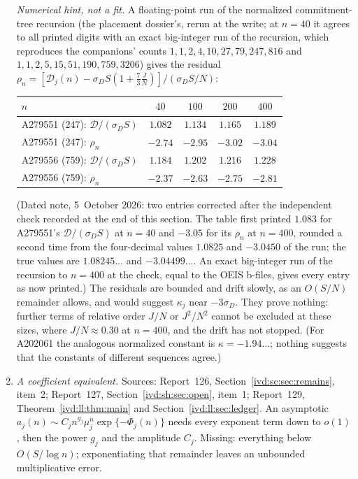 \documentclass[11pt,letterpaper]{article}
\theoremstyle{remark}\newtheorem{remark}[theorem]{Remark}
\numberwithin{equation}{section}
\newcommand{\Dfc}{\mathcal D}
\begin{document}
\begin{enumerate}
\emph{Numerical hint, not a fit.} A floating-point run of the normalized commitment-tree recursion (the placement dossier's, rerun at the write; at $n=40$ it agrees to all printed digits with an exact big-integer run of the recursion, which reproduces the companions' counts $1,1,2,4,10,27,79,247,816$ and $1,1,2,5,15,51,190,759,3206$) gives the residual $\rho_n=[\Dfc_j(n)-\sigma_DS(1+\frac73\frac JN)]/(\sigma_DS/N)$:
\begin{center}
\small
\begin{tabular}{@{}lcccc@{}}
\toprule
$n$ & $40$ & $100$ & $200$ & $400$\\
\midrule
A279551 (247): $\Dfc/(\sigma_DS)$ & $1.082$ & $1.134$ & $1.165$ & $1.189$\\
A279551 (247): $\rho_n$ & $-2.74$ & $-2.95$ & $-3.02$ & $-3.04$\\
A279556 (759): $\Dfc/(\sigma_DS)$ & $1.184$ & $1.202$ & $1.216$ & $1.228$\\
A279556 (759): $\rho_n$ & $-2.37$ & $-2.63$ & $-2.75$ & $-2.81$\\
\bottomrule
\end{tabular}
\end{center}
(Dated note, 5~October 2026: two entries corrected after the independent check recorded at the end of this section. The table first printed $1.083$ for A279551's $\Dfc/(\sigma_DS)$ at $n=40$ and $-3.05$ for its $\rho_n$ at $n=400$, rounded a second time from the four-decimal values $1.0825$ and $-3.0450$ of the run; the true values are $1.08245\ldots$ and $-3.04499\ldots$. An exact big-integer run of the recursion to $n=400$ at the check, equal to the OEIS b-files, gives every entry as now printed.)
The residuals are bounded and drift slowly, as an $O(S/N)$ remainder allows, and would suggest $\kappa_j$ near $-3\sigma_D$. They prove nothing: further terms of relative order $J/N$ or $J^2/N^2$ cannot be excluded at these sizes, where $J/N\approx0.30$ at $n=400$, and the drift has not stopped. (For A202061 the analogous normalized constant is $\kappa=-1.94\ldots$; nothing suggests that the constants of different sequences agree.)
\item \emph{A coefficient equivalent.} Sources: Report~126, Section~\ref{ivd:sc:sec:remains}, item~2; Report~127, Section~\ref{ivd:sh:sec:open}, item~1; Report~129, Theorem~\ref{ivd:ll:thm:main} and Section~\ref{ivd:ll:sec:ledger}. An asymptotic $a_j(n)\sim C_jn^{g_j}\mu_j^n\exp\{-\Phi_j(n)\}$ needs every exponent term down to $o(1)$, then the power $g_j$ and the amplitude $C_j$. Missing: everything below $O(S/\log n)$; exponentiating that remainder leaves an unbounded multiplicative error.

\end{enumerate}
\end{document}
